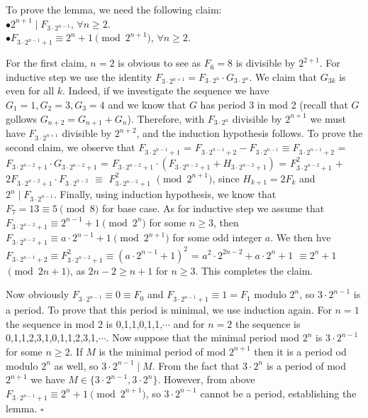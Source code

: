 \documentclass[11pt,a4paper]{article}
\begin{document}
To prove the lemma, we need the following claim:\\
$\bullet 2^{n+1}\mid F_{3\cdot 2^{n-1}}$, $\forall n\ge 2.$\\
$\bullet F_{3\cdot 2^{n-1}+1}\equiv 2^{n}+1\pmod {2^{n+1}}$, $\forall n\ge 2.$

For the first claim, $n=2$ is obvious to see as $F_6=8$ is divisible by $2^{2+1}$. For inductive step we use the identity $F_{3\cdot 2^{n+1}}=F_{3\cdot 2^{n}}\cdot G_{3\cdot 2^{n}}$. We claim that $G_{3k}$ is even for all $k$. Indeed, if we investigate the sequence we have $G_1=1, G_2=3, G_3=4$ and we know that $G$ has period 3 in mod 2 (recall that $G$ gollows $G_{n+2}=G_{n+1}+G_n$). Therefore, with $F_{3\cdot 2^{n}}$ divisible by $2^{n+1}$ we must have $F_{3\cdot 2^{n+1}}$ divisible by $2^{n+2}$, and the induction hypothesis follows. To prove the second claim, we observe that $F_{3\cdot 2^{n-1}+1}$ = $F_{3\cdot 2^{n-1}+2}-F_{3\cdot 2^{n-1}}\equiv F_{3\cdot 2^{n-1}+2}$ = $F_{3\cdot 2^{n-2}+1}\cdot G_{3\cdot 2^{n-2}+1}$ = $F_{3\cdot 2^{n-2}+1}\cdot (F_{3\cdot 2^{n-2}+1}+H_{3\cdot 2^{n-2}+1})$ = $F_{3\cdot 2^{n-2}+1}^2$ + $2F_{3\cdot 2^{n-2}+1}\cdot F_{3\cdot 2^{n-2}}$ $\equiv$ $F_{3\cdot 2^{n-2}+1}^2$ $\pmod {2^{n+1}}$, since $H_{k+1}=2F_k$ and $2^n\mid F_{3\cdot 2^{n-1}}$. Finally, using induction hypothesis, we know that $F_7=13\equiv 5\pmod {8}$ for base case. As for inductive step we assume that $F_{3\cdot 2^{n-2}+1}\equiv 2^{n-1}+1\pmod {2^n}$ for some $n\ge 3$, then $F_{3\cdot 2^{n-2}+1}\equiv a\cdot 2^{n-1}+1\pmod {2^{n+1}}$ for some odd integer $a$. We then hve $F_{3\cdot 2^{n-1}+2}\equiv F_{3\cdot 2^{n-2}+1}^2\equiv (a\cdot 2^{n-1}+1)^2$ = $a^2\cdot 2^{2n-2}+a\cdot 2^n +1$ $\equiv 2^n+1$ $\pmod {2{n+1}}$, as $2n-2\ge n+1$ for $n\ge 3$. This completes the claim.

Now obviously $F_{3\cdot 2^{n-1}}\equiv 0\equiv F_0$ and $F_{3\cdot 2^{n-1}+1}\equiv 1= F_1$ modulo $2^n$, so $3\cdot 2^{n-1}$ is a period. To prove that this period is minimal, we use induction again. For $n=1$ the sequence in mod 2 is 0,1,1,0,1,1,$\cdots$ and for $n=2$ the sequence is 0,1,1,2,3,1,0,1,1,2,3,1,$\cdots$. Now suppose that the minimal period mod $2^n$ is $3\cdot 2^{n-1}$ for some $n\ge 2$. If $M$ is the minimal period of mod $2^{n+1}$ then it is a period od modulo $2^n$ as well, so $3\cdot 2^{n-1}\mid M$. From the fact that $3\cdot 2^n$ is a period of mod $2^{n+1}$ we have $M\in \{3\cdot 2^{n-1}, 3\cdot 2^n\}.$ However, from above $F_{3\cdot 2^{n-1}+1}\equiv 2^{n}+1\pmod {2^{n+1}}$, so $3\cdot 2^{n-1}$ cannot be a period, establishing the lemma. $\square$
\end{document}
